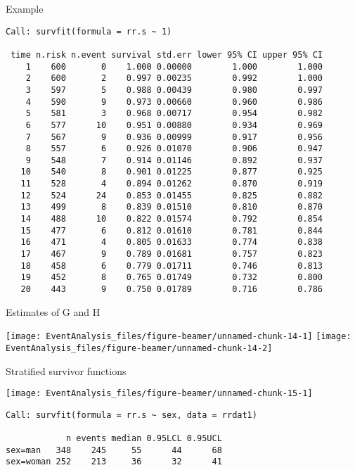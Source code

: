 \documentclass[10pt,ignorenonframetext,]{beamer}
\begin{document}
\begin{frame}[fragile]{Example}

\tiny

\begin{verbatim}
Call: survfit(formula = rr.s ~ 1)

 time n.risk n.event survival std.err lower 95% CI upper 95% CI
    1    600       0    1.000 0.00000        1.000        1.000
    2    600       2    0.997 0.00235        0.992        1.000
    3    597       5    0.988 0.00439        0.980        0.997
    4    590       9    0.973 0.00660        0.960        0.986
    5    581       3    0.968 0.00717        0.954        0.982
    6    577      10    0.951 0.00880        0.934        0.969
    7    567       9    0.936 0.00999        0.917        0.956
    8    557       6    0.926 0.01070        0.906        0.947
    9    548       7    0.914 0.01146        0.892        0.937
   10    540       8    0.901 0.01225        0.877        0.925
   11    528       4    0.894 0.01262        0.870        0.919
   12    524      24    0.853 0.01455        0.825        0.882
   13    499       8    0.839 0.01510        0.810        0.870
   14    488      10    0.822 0.01574        0.792        0.854
   15    477       6    0.812 0.01610        0.781        0.844
   16    471       4    0.805 0.01633        0.774        0.838
   17    467       9    0.789 0.01681        0.757        0.823
   18    458       6    0.779 0.01711        0.746        0.813
   19    452       8    0.765 0.01749        0.732        0.800
   20    443       9    0.750 0.01789        0.716        0.786
\end{verbatim}

\end{frame}

\begin{frame}{Estimates of G and H}

\texttt{[image: EventAnalysis\_files/figure-beamer/unnamed-chunk-14-1]}
\texttt{[image: EventAnalysis\_files/figure-beamer/unnamed-chunk-14-2]}

\end{frame}

\begin{frame}[fragile]{Stratified survivor functions}

\begin{center}\texttt{[image: EventAnalysis\_files/figure-beamer/unnamed-chunk-15-1]} \end{center}

\begin{verbatim}
Call: survfit(formula = rr.s ~ sex, data = rrdat1)

            n events median 0.95LCL 0.95UCL
sex=man   348    245     55      44      68
sex=woman 252    213     36      32      41
\end{verbatim}

\end{frame}
\end{document}
